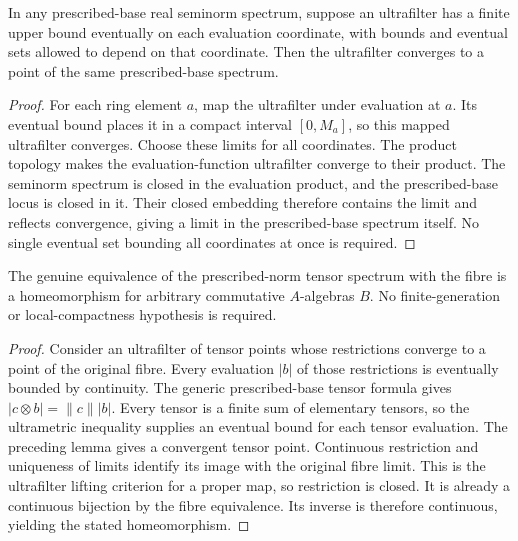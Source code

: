 \begin{lemma}
\label{spectrum:bounded-ultrafilter-limit}
\leanok
{}
In any prescribed-base real seminorm spectrum, suppose an ultrafilter
has a finite upper bound eventually on each evaluation coordinate,
with bounds and eventual sets allowed to depend on that coordinate.
Then the ultrafilter converges to a point of the same prescribed-base spectrum.
\end{lemma}
\begin{proof}
For each ring element $a$, map the ultrafilter under evaluation at $a$.
Its eventual bound places it in a compact interval $[0,M_a]$, so this
mapped ultrafilter converges. Choose these limits for all coordinates.
The product topology makes the evaluation-function ultrafilter converge
to their product. The seminorm spectrum is closed in the evaluation
product, and the prescribed-base locus is closed in it. Their closed
embedding therefore contains the limit and reflects convergence,
giving a limit in the prescribed-base spectrum itself.
No single eventual set bounding all coordinates at once is required.
\end{proof}

\begin{theorem}
\label{spectrum:fibre-homeomorphism}
\leanok
{}
The genuine equivalence of the prescribed-norm tensor spectrum with
the fibre is a homeomorphism for arbitrary commutative $A$-algebras $B$.
No finite-generation or local-compactness hypothesis is required.
\end{theorem}
\begin{proof}
Consider an ultrafilter of tensor points whose restrictions converge
to a point of the original fibre. Every evaluation $|b|$ of those
restrictions is eventually bounded by continuity. The generic prescribed-base
tensor formula gives $|c\otimes b|=\lVert c\rVert|b|$.
Every tensor is a finite sum of elementary tensors, so the ultrametric
inequality supplies an eventual bound for each tensor evaluation.
The preceding lemma gives a convergent tensor point. Continuous restriction
and uniqueness of limits identify its image with the original fibre limit.
This is the ultrafilter lifting criterion for a proper map, so restriction
is closed. It is already a continuous bijection by the fibre equivalence.
Its inverse is therefore continuous, yielding the stated homeomorphism.
\end{proof}
